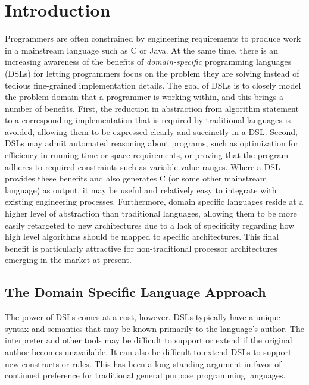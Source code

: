 \section{Introduction}

Programmers are often constrained by engineering requirements to produce work
in a mainstream language such as C or Java. At the same time, there is an
increasing awareness of the benefits of \emph{domain-specific} programming
languages (DSLs) for letting programmers focus on the problem they are solving
instead of tedious fine-grained implementation details.  The goal of DSLs is to
closely model the problem domain that a programmer is working within, and this
brings a number of benefits. First, the reduction in abstraction from
algorithm statement to a corresponding implementation that is required by
traditional languages is avoided, allowing them to be expressed clearly and
succinctly in a DSL. Second, DSLs may admit automated reasoning about
programs, such as optimization for efficiency in running time or space
requirements, or proving that the program adheres to required constraints such
as variable value ranges. Where a DSL provides these benefits and also
generates C (or some other mainstream language) as output, it may be useful
and relatively easy to integrate with existing engineering processes.
Furthermore, domain specific languages reside at a higher level of abstraction
than traditional languages, allowing them to be more easily retargeted to new
architectures due to a lack of specificity regarding how high level algorithms
should be mapped to specific architectures. This final benefit is particularly
attractive for non-traditional processor architectures emerging in the market
at present.

\subsection{The Domain Specific Language Approach}

The power of DSLs comes at a cost, however. DSLs typically have a unique
syntax and semantics that may be known primarily to the language's author. The
interpreter and other tools may be difficult to support or extend if the
original author becomes unavailable. It can also be difficult to extend DSLs
to support new constructs or rules. This has been a long standing argument in
favor of continued preference for traditional general purpose programming
languages.


